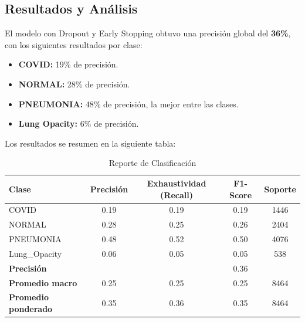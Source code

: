 \documentclass{article}
\begin{document}
	
	
	\subsection{Resultados y Análisis}
	
	El modelo con Dropout y Early Stopping obtuvo una precisión global del \textbf{36\%}, con los siguientes resultados por clase:
	
	\begin{itemize}
		\item \textbf{COVID:} 19\% de precisión.
		\item \textbf{NORMAL:} 28\% de precisión.
		\item \textbf{PNEUMONIA:} 48\% de precisión, la mejor entre las clases.
		\item \textbf{Lung Opacity:} 6\% de precisión.
	\end{itemize}
	
	Los resultados se resumen en la siguiente tabla:
	
\begin{table}[ht]
	\centering
	\caption{Reporte de Clasificación}
	\label{tab:classification_report}
	\begin{tabular}{lcccc}
		\toprule
		\textbf{Clase}       & \textbf{Precisión} & \textbf{Exhaustividad (Recall)} & \textbf{F1-Score} & \textbf{Soporte} \\ 
		\midrule
		COVID                & 0.19               & 0.19                           & 0.19              & 1446             \\ 
		NORMAL               & 0.28               & 0.25                           & 0.26              & 2404             \\ 
		PNEUMONIA            & 0.48               & 0.52                           & 0.50              & 4076             \\ 
		Lung\_Opacity        & 0.06               & 0.05                           & 0.05              & 538              \\ 
		\midrule
		\textbf{Precisión}   &                    &                                 & 0.36              &                  \\ 
		\midrule
		\textbf{Promedio macro} & 0.25               & 0.25                           & 0.25              & 8464             \\ 
		\textbf{Promedio ponderado} & 0.35               & 0.36                           & 0.35              & 8464             \\ 
		\bottomrule
	\end{tabular}
\end{table}
	
\end{document}
